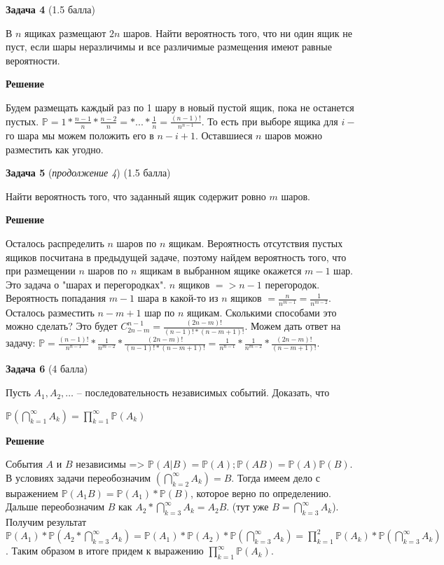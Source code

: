 \documentclass{article}
\newcommand\myp{\mathbb P}
\begin{document}
\textbf{Задача 4} (1.5 балла)

В $n$ ящиках размещают $2n$ шаров. Найти вероятность того, что ни один ящик не пуст, если шары неразличимы и все различимые размещения имеют равные вероятности.

\textbf{Решение}

Будем размещать каждый раз по 1 шару в новый пустой ящик, пока не останется пустых. $\myp = 1 * \frac{n-1}{n} * \frac{n-2}{n} = * ... * \frac{1}{n} = \frac{(n-1)!}{n^{n-1}}$. То есть при выборе ящика для $i-$го шара мы можем положить его в $n - i + 1$. Оставшиеся $n$ шаров можно разместить как угодно.
\newline

\textbf{Задача 5} (\textit{продолжение 4}) (1.5 балла)

Найти вероятность того, что заданный ящик содержит ровно $m$ шаров.

\textbf{Решение}

Осталось распределить $n$ шаров по $n$ ящикам. Вероятность отсутствия пустых ящиков посчитана в предыдущей задаче, поэтому найдем вероятность того, что при размещении $n$ шаров по $n$ ящикам в выбранном ящике окажется $m - 1$ шар. Это задача о "шарах и перегородках". $n$ ящиков $=> n - 1$ перегородок. Вероятность попадания $m - 1$ шара в какой-то из $n$ ящиков $= \frac{n}{n^{m-1}} = \frac{1}{n^{m-2}}$. Осталось разместить $n - m + 1$ шар по $n$ ящикам. Сколькими способами это можно сделать? Это будет $C_{2n-m}^{n-1} = \frac{(2n-m)!}{(n-1)!*(n-m+1)!}$. Можем дать ответ на задачу: $\myp = \frac{(n-1)!}{n^{n-1}} * \frac{1}{n^{m-2}} * \frac{(2n-m)!}{(n-1)!*(n-m+1)!} = \frac{1}{n^{n-1}} * \frac{1}{n^{m-2}} * \frac{(2n-m)!}{(n-m+1)!}$.
\newline

\textbf{Задача 6} (4 балла)

Пусть $A_1, A_2, \dots$ -- последовательность независимых событий. Доказать, что

\begin{center}
    $\myp(\bigcap\limits_{k=1}^{\infty} A_k) = \prod\limits_{k=1}^{\infty}\myp(A_k)$ 
\end{center}

\textbf{Решение}

События $A$ и $B$ независимы => $\myp(A|B) = \myp(A);\myp(AB) = \myp(A)\myp(B)$. 
В условиях задачи переобозначим $(\bigcap\limits_{k=2}^{\infty} A_k) = B$. Тогда имеем дело с выражением $\myp(A_1B) = \myp(A_1)*\myp(B)$, которое верно по определению. Дальше переобозначим $B$ как $A_2 * \bigcap\limits_{k=3}^{\infty} A_k = A_2 B$. (тут уже $B = \bigcap\limits_{k=3}^{\infty} A_k$). Получим результат $\myp(A_1)*\myp(A_2 * \bigcap\limits_{k=3}^{\infty} A_k) = \myp(A_1)*\myp(A_2) * \myp(\bigcap\limits_{k=3}^{\infty} A_k) = \prod\limits_{k=1}^{2}\myp(A_k) * \myp(\bigcap\limits_{k=3}^{\infty} A_k)$. Таким образом в итоге придем к выражению $\prod\limits_{k=1}^{\infty}\myp(A_k)$.
\newline
\end{document}
